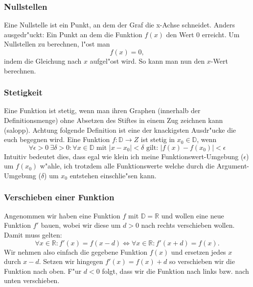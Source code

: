 \subsubsection{Nullstellen}
Eine Nullstelle ist ein Punkt, an dem der Graf die x-Achse schneidet. Anders ausgedr"uckt: Ein Punkt an dem die Funktion $f(x)$ den Wert $0$ erreicht. Um Nullstellen zu berechnen, l"ost man
\begin{equation*}
f(x) = 0,
\end{equation*}
indem die Gleichung nach $x$ aufgel"ost wird. So kann man nun den $x$-Wert berechnen.

\subsubsection{Stetigkeit}
Eine Funktion ist stetig, wenn man ihren Graphen (innerhalb der Definitionsmenge) ohne Absetzen des Stiftes in einem Zug zeichnen kann (salopp). Achtung folgende Definition ist eine der knackigsten Ausdr"ucke die euch begegnen wird. Eine Funktion $f : \mathbb{D} \to Z$ ist stetig in $x_0 \in \mathbb{D}$, wenn
\begin{equation*}
\forall \epsilon > 0 \ \exists \delta > 0 : \forall x \in \mathbb{D} \text{ mit } \left|x - x_0 \right| < \delta \text{ gilt: } \left| f(x) - f(x_0) \right| < \epsilon 
\end{equation*}
Intuitiv bedeutet dies, dass egal wie klein ich meine Funktionswert-Umgebung ($\epsilon$) um $f(x_0)$ w"ahle, ich trotzdem alle Funktionswerte welche durch die Argument-Umgebung ($\delta$) um $x_0$ entstehen einschlie"sen kann.

\subsubsection{Verschieben einer Funktion}
Angenommen wir haben eine Funktion $f$ mit $\mathbb{D} = \mathbb{R}$ und wollen eine neue Funktion $f'$ bauen, wobei wir diese um $d > 0$ nach rechts verschieben wollen. Damit muss gelten:
\begin{equation*}
\forall x \in \mathbb{R} :  f'(x) = f(x-d) \iff \forall x \in \mathbb{R} : f'(x+d) = f(x).
\end{equation*}
Wir nehmen also einfach die gegebene Funktion $f(x)$ und ersetzen jedes $x$ durch $x-d$. Setzen wir hingegen $f'(x) = f(x) + d$ so verschieben wir die Funktion nach oben. F"ur $d < 0$ folgt, dass wir die Funktion nach links bzw. nach unten verschieben.